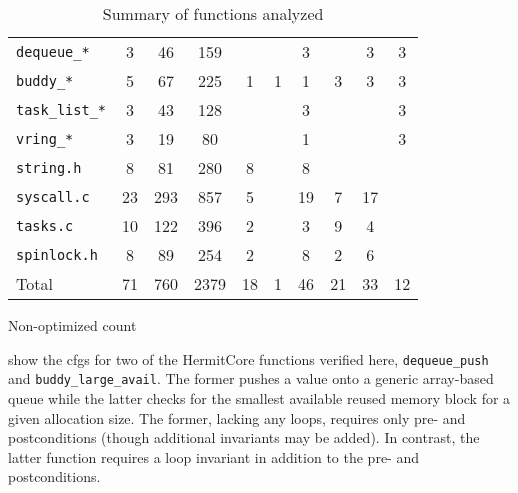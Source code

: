 \begin{table*}
  \renewcommand\theadalign{tc}
  \centering
  \begin{threeparttable}
    \caption{Summary of functions analyzed}
    \label{tbl:functions}
    \begin{tabular}{lSSSSSSSS S[table-figures-integer=2]}
      \toprule
       & {} & {} & {} & {} & {} & {} & {} & {} & {} \\
      \midrule
      \lstinline|dequeue_*| & 3 & 46 & 159 &&& 3 && 3 & 3 \\
      \lstinline|buddy_*| & 5 & 67 & 225 & 1 & 1 & 1 & 3 & 3 & 3 \\
      \lstinline|task_list_*| & 3 & 43 & 128 &&& 3 &&& 3 \\
      \lstinline|vring_*| & 3 & 19 & 80 &&& 1 &&& 3 \\
      \lstinline|string.h| & 8 & 81 & 280 & 8 && 8 &&& \\
      \lstinline|syscall.c| & 23 & 293 & 857 & 5 && 19 & 7 & 17 & \\
      \lstinline|tasks.c| & 10 & 122 & 396 & 2 && 3 & 9 & 4 & \\
      \lstinline|spinlock.h| & 8 & 89 & 254 & 2 && 8 & 2 & 6 & \\
      Total & 71 & 760 & 2379 & 18 & 1 & 46 & 21 & 33 & 12 \\
      \bottomrule
    \end{tabular}
    \begin{tablenotes}
      \item[\dag] Non-optimized count
    \end{tablenotes}
  \end{threeparttable}
\end{table*}

 show the \acp{cfg} for two of
the HermitCore functions verified here,
\lstinline|dequeue_push| and \lstinline|buddy_large_avail|.
The former pushes a value onto a generic array-based queue
while the latter checks for the smallest available reused memory block
for a given allocation size.
The former, lacking any loops, requires only pre- and postconditions
(though additional invariants may be added).
In contrast, the latter function
requires a loop invariant in addition to the pre- and postconditions.

